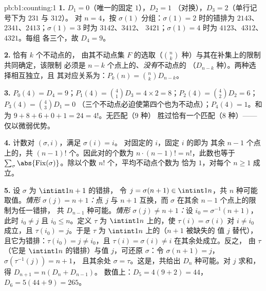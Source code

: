 \begin{solution}{pb:b1:counting:1}
\textbf{1.} $D_1 = 0$（唯一的固定 $1$），$D_2 = 1$
（对换），$D_3 = 2$（单行记号下为 $231$ 与 $312$）。
对 $n = 4$，按 $\sigma(1)$ 分组：$\sigma(1) = 2$ 时的错排为
$2143$、$2341$、$2413$；$\sigma(1) = 3$ 时为 $3142$、$3412$、
$3421$；$\sigma(1) = 4$ 时为 $4123$、$4312$、$4321$。每组
各三个，故 $D_4 = 9$。

\textbf{2.} 恰有 $k$ 个不动点的，
由其不动点集 $F$ 的选取（$\binom nk$
种）与其在补集上的限制共同确定，该限制
必须是 $n - k$ 个点上的、\emph{没有}不动点的
（$D_{n-k}$ 种）。两种选择相互独立，且
其对应关系为：$P_k(n) = \binom nk D_{n-k}$。

\textbf{3.} $P_0(4) = D_4 = 9$；$P_1(4) = \binom41 D_3 = 4 \times 2
= 8$；$P_2(4) = \binom42 D_2 = 6$；$P_3(4) = \binom43 D_1 = 0$
（三个不动点必迫使第四个也为不动点）；$P_4(4) = 1$。和为 $9 + 8 + 6
+ 0 + 1 = 24 = 4!$。无匹配（$9$ 种）
胜过恰有一个匹配（$8$ 种）——仅以微弱优势。

\textbf{4.} 计数对 $(\sigma, i)$，满足 $\sigma(i) = i$。
对固定的 $i$，固定 $i$ 的即为
其余 $n - 1$ 个点上的，共 $(n-1)!$ 个。因此对的个数为
$n \cdot (n-1)! = n!$，此数也等于
$\sum_\sigma \abs{\mathrm{Fix}(\sigma)}$。除以个数
$n!$ 个，平均不动点个数为
恰为 $1$，对每个 $n \geq 1$ 成立。

\textbf{5.} 设 $\sigma$ 为 $\intint1{n+1}$ 的错排，
令 $j = \sigma(n+1) \in \intint1n$，共 $n$ 种可能取值。\emph{情形
$\sigma(j) = n+1$：}点 $j$ 与 $n+1$ 互换，而 $\sigma$
在其余 $n - 1$ 个点上的限制为任一错排，
共 $D_{n-1}$ 种可能。\emph{情形 $\sigma(j)
\neq n+1$：}设 $i_0 = \sigma^{-1}(n+1)$，此时 $i_0 \neq j$ 且
$i_0 \leq n$。定义 $\tau$ 为 $\intint1n$ 上的，使 $\tau(i) = \sigma(i)$
对 $i \neq i_0$ 成立，且 $\tau(i_0) = j$。于是 $\tau$ 为
$\intint1n$ 上的（$n+1$ 被缺失的
值 $j$ 替代），且它为错排：$\tau(i_0) = j \neq i_0$，且
$\tau(i) = \sigma(i) \neq i$ 在其余处成立。反之，
由 $\tau$（它是 $\intint1n$ 的错排）与值 $j$，可还原
$\sigma$：令 $\sigma(n+1) = j$，$\sigma(\tau^{-1}(j)) = n+1$，
且其余处 $\sigma = \tau$。这是，共给出 $D_n$
种可能。对 $j$ 求和，得 $D_{n+1} = n(D_n + D_{n-1})$。
数值上：$D_5 = 4(9 + 2) = 44$，$D_6 = 5(44 + 9) = 265$。


\end{solution}
